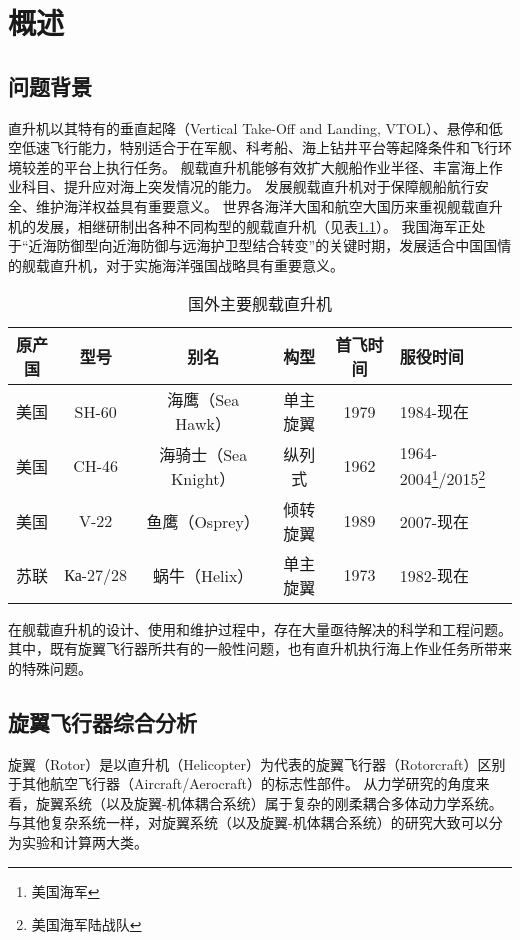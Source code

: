 \documentclass[doctor,openright,twoside,color]{buaathesis}
\begin{document}
\mainmatter
\pagestyle{mainmatter}

\chapter{概述}

\section{问题背景}
直升机以其特有的垂直起降（Vertical Take-Off and Landing, VTOL）、悬停和低空低速飞行能力，特别适合于在军舰、科考船、海上钻井平台等起降条件和飞行环境较差的平台上执行任务。
舰载直升机能够有效扩大舰船作业半径、丰富海上作业科目、提升应对海上突发情况的能力。
发展舰载直升机对于保障舰船航行安全、维护海洋权益具有重要意义。
世界各海洋大国和航空大国历来重视舰载直升机的发展，相继研制出各种不同构型的舰载直升机（见表\ref{Marine-Helicopter}）。
我国海军正处于“近海防御型向近海防御与远海护卫型结合转变”的关键时期，发展适合中国国情的舰载直升机，对于实施海洋强国战略具有重要意义。
\begin{longtable}[c]{cccccl}
\caption{国外主要舰载直升机}
\label{Marine-Helicopter}\\\toprule[1pt]
原产国 & 型号 & 别名 & 构型 & 首飞时间 & 服役时间
\\\midrule
美国 & SH-60 & 海鹰（Sea Hawk） & 单主旋翼 & 1979 & 1984-现在  \\
美国 & CH-46 & 海骑士（Sea Knight） & 纵列式 & 1962 & 1964-2004\footnote{美国海军}/2015\footnote{美国海军陆战队}  \\
美国 & V-22 & 鱼鹰（Osprey） & 倾转旋翼 & 1989 & 2007-现在  \\
苏联 & Ка-27/28 & 蜗牛（Helix） & 单主旋翼 & 1973 & 1982-现在  \\
\bottomrule[1pt]
\end{longtable}

在舰载直升机的设计、使用和维护过程中，存在大量亟待解决的科学和工程问题。
其中，既有旋翼飞行器所共有的一般性问题，也有直升机执行海上作业任务所带来的特殊问题。

\section{旋翼飞行器综合分析}
旋翼（Rotor）是以直升机（Helicopter）为代表的旋翼飞行器（Rotorcraft）区别于其他航空飞行器（Aircraft/Aerocraft）的标志性部件。
从力学研究的角度来看，旋翼系统（以及旋翼-机体耦合系统）属于复杂的刚柔耦合多体动力学系统。
与其他复杂系统一样，对旋翼系统（以及旋翼-机体耦合系统）的研究大致可以分为实验和计算两大类。
\end{document}
